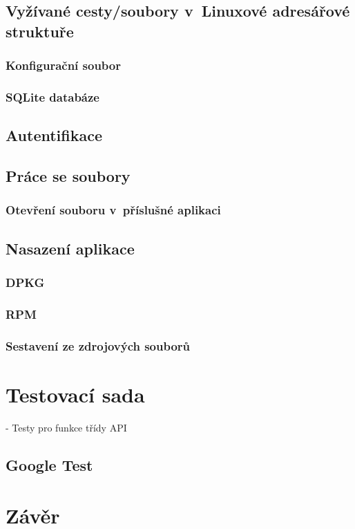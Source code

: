 \section{Vyžívané cesty/soubory v Linuxové adresářové struktuře}
\subsection{Konfigurační soubor}
\subsection{SQLite databáze}
\section{Autentifikace}
\section{Práce se soubory}
\subsection{Otevření souboru v příslušné aplikaci}

\cite{xdg}

\section{Nasazení aplikace}
\subsection{DPKG} %
\subsection{RPM} %
\subsection{Sestavení ze zdrojových souborů}

\chapter{Testovací sada}

- Testy pro funkce třídy API

\section{Google Test}

\chapter{Závěr}




